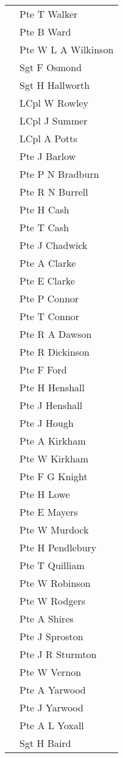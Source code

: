 \begin{center}
\begin{tabular}{rl}
    & Pte T Walker \\
    & Pte B Ward \\
    & Pte W L A Wilkinson \\
    & Sgt F Osmond \\
    & Sgt H Hallworth \\
    & LCpl W Rowley \\
    & LCpl J Summer \\
    & LCpl A Potts \\
    & Pte J Barlow \\
    & Pte P N Bradburn \\
    & Pte R N Burrell \\
    & Pte H Cash \\
    & Pte T Cash \\
    & Pte J Chadwick \\
    & Pte A Clarke \\
    & Pte E Clarke \\
    & Pte P Connor \\
    & Pte T Connor \\
    & Pte R A Dawson \\
    & Pte R Dickinson \\
    & Pte F Ford \\
    & Pte H Henshall \\
    & Pte J Henshall \\
    & Pte J Hough \\
    & Pte A Kirkham \\
    & Pte W Kirkham \\
    & Pte F G Knight \\
    & Pte H Lowe \\
    & Pte E Mayers \\
    & Pte W Murdock \\
    & Pte H Pendlebury \\
    & Pte T Quilliam \\
    & Pte W Robinson \\
    & Pte W Rodgers \\
    & Pte A Shires \\
    & Pte J Sproston \\
    & Pte J R Sturmton \\
    & Pte W Vernon \\
    & Pte A Yarwood \\
    & Pte J Yarwood \\
    & Pte A L Yoxall \\
    & Sgt H Baird \\

\end{tabular}
\end{center}
